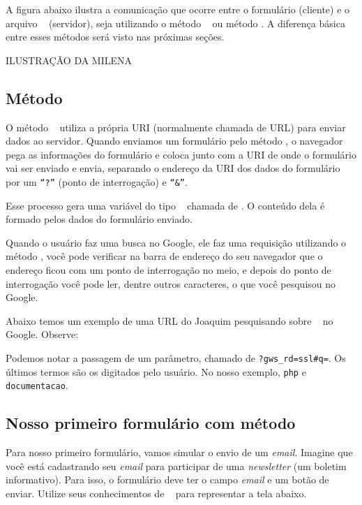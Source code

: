 A figura abaixo ilustra a comunicação que ocorre entre o formulário (cliente) e o arquivo 
\php~ (servidor), seja utilizando o método \metodoGET~ ou método \metodoPOST. A diferença básica 
entre esses métodos será visto nas próximas seções. 

ILUSTRAÇÃO DA MILENA

\subsection{Método \metodoGET}

O método \metodoGET~ utiliza a própria URI (normalmente chamada de URL) para enviar dados ao 
servidor. Quando enviamos um formulário pelo método \metodoGET, o navegador pega as informações 
do formulário e coloca junto com a URI de onde o formulário vai ser enviado e envia, 
separando o endereço da URI dos dados do formulário por um \texttt{``?''} (ponto de interrogação) 
e \texttt{``\&''}.

Esse processo gera uma variável do tipo \tipoarray~ chamada de \variavelget. O conteúdo dela é
formado pelos dados do formulário enviado.

Quando o usuário faz uma busca no Google, ele faz uma requisição utilizando o método \metodoGET, 
você pode verificar na barra de endereço do seu navegador que o endereço ficou com um ponto de 
interrogação no meio, e depois do ponto de interrogação você pode ler, dentre outros caracteres, 
o que você pesquisou no Google.

Abaixo temos um exemplo de uma URL do Joaquim pesquisando sobre \php~ no Google. Observe:


Podemos notar a passagem de um parâmetro, chamado de \texttt{?gws\_rd=ssl\#q=}. Os últimos termos
são os digitados pelo usuário. No nosso exemplo, \texttt{php} e \texttt{documentacao}.

\subsection{Nosso primeiro formulário com método \metodoGET}
\label{nosso-primeiro-formulario-com-metodo-get}

Para nosso primeiro formulário, vamos simular o envio de um \textit{email}. Imagine que você
está cadastrando seu \textit{email} para participar de uma \textit{newsletter} (um boletim informativo).
Para isso, o formulário deve ter o campo \textit{email} e um botão de enviar.
Utilize seus conhecimentos de \html~ para representar a tela abaixo.

